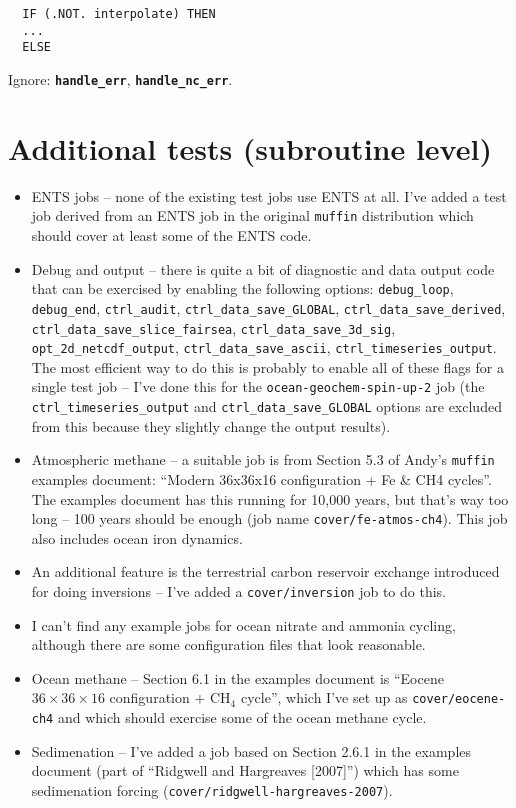 \documentclass[a4paper,10pt,article]{memoir}
\begin{document}
\begin{verbatim}
  IF (.NOT. interpolate) THEN
  ...
  ELSE
\end{verbatim}

Ignore: \textbf{\texttt{handle\_err}},
\textbf{\texttt{handle\_nc\_err}}.


\section{Additional tests (subroutine level)}

\begin{itemize}
  \item{ENTS jobs -- none of the existing test jobs use ENTS at all.
    I've added a test job derived from an ENTS job in the original
    \texttt{muffin} distribution which should cover at least some of
    the ENTS code.}
  \item{Debug and output -- there is quite a bit of diagnostic and
    data output code that can be exercised by enabling the following
    options: \texttt{debug\_loop}, \texttt{debug\_end},
    \texttt{ctrl\_audit}, \texttt{ctrl\_data\_save\_GLOBAL},
    \texttt{ctrl\_data\_save\_derived},
    \texttt{ctrl\_data\_save\_slice\_fairsea},
    \texttt{ctrl\_data\_save\_3d\_sig},
    \texttt{opt\_2d\_netcdf\_output},
    \texttt{ctrl\_data\_save\_ascii},
    \texttt{ctrl\_timeseries\_output}.  The most efficient way to do
    this is probably to enable all of these flags for a single test
    job -- I've done this for the \texttt{ocean-geochem-spin-up-2} job
    (the \texttt{ctrl\_timeseries\_output} and
    \texttt{ctrl\_data\_save\_GLOBAL} options are excluded from this
    because they slightly change the output results).}
  \item{Atmospheric methane -- a suitable job is from Section 5.3 of
    Andy's \texttt{muffin} examples document: ``Modern 36x36x16
    configuration + Fe \& CH4 cycles''.  The examples document has
    this running for 10,000 years, but that's way too long -- 100
    years should be enough (job name \texttt{cover/fe-atmos-ch4}).
    This job also includes ocean iron dynamics.}
  \item{An additional feature is the terrestrial carbon reservoir
    exchange introduced for doing inversions -- I've added a
    \texttt{cover/inversion} job to do this.}
  \item{I can't find any example jobs for ocean nitrate and ammonia
    cycling, although there are some configuration files that look
    reasonable.}
  \item{Ocean methane -- Section 6.1 in the examples document is
    ``Eocene $36 \times 36 \times 16$ configuration + $\mathrm{CH_4}$
    cycle'', which I've set up as \texttt{cover/eocene-ch4} and which
    should exercise some of the ocean methane cycle.}
  \item{Sedimenation -- I've added a job based on Section 2.6.1 in the
    examples document (part of ``Ridgwell and Hargreaves [2007]'')
    which has some sedimenation forcing
    (\texttt{cover/ridgwell-hargreaves-2007}).}
\end{itemize}
\end{document}

